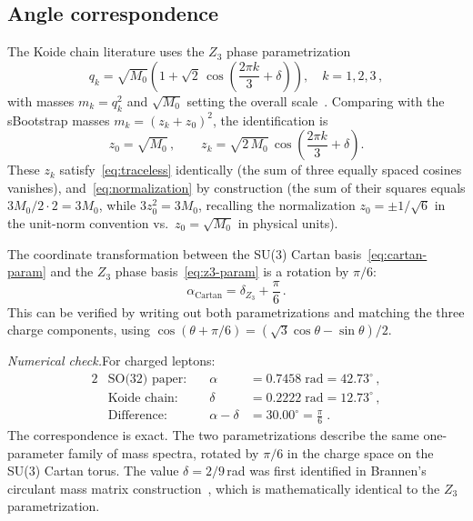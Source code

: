 \documentclass[prd,twocolumn,superscriptaddress,nofootinbib]{revtex4-2}
\begin{document}
\subsection{Angle correspondence}
\label{sec:angle}

The Koide chain literature uses the $Z_3$ phase parametrization
\begin{equation}
  q_k = \sqrt{M_0}\left(1+\sqrt{2}\,\cos\!\left(\frac{2\pi k}{3}
  +\delta\right)\right),\quad k=1,2,3\,,
  \label{eq:z3-param}
\end{equation}
with masses $m_k=q_k^2$ and $\sqrt{M_0}$ setting the overall
scale~\cite{Brannen2006,Zenczykowski2012}.  Comparing with
the sBootstrap masses $m_k=(z_k+z_0)^2$, the identification is
\begin{equation}
  z_0 = \sqrt{M_0}\,,\qquad
  z_k = \sqrt{2\,M_0}\,\cos\!\left(\frac{2\pi k}{3}+\delta\right).
  \label{eq:z-q-map}
\end{equation}
These $z_k$ satisfy~\eqref{eq:traceless} identically (the sum of three
equally spaced cosines vanishes), and~\eqref{eq:normalization} by
construction (the sum of their squares equals $3M_0/2\cdot 2 = 3M_0$,
while $3z_0^2=3M_0$, recalling the normalization $z_0=\pm 1/\sqrt{6}$
in the unit-norm convention vs.\ $z_0=\sqrt{M_0}$ in physical units).

The coordinate transformation between the SU(3) Cartan
basis~\eqref{eq:cartan-param} and the $Z_3$ phase
basis~\eqref{eq:z3-param} is a rotation by $\pi/6$:
\begin{equation}
  \alpha_{\text{Cartan}} = \delta_{Z_3} + \frac{\pi}{6}\,.
  \label{eq:angle-shift}
\end{equation}
This can be verified by writing out both parametrizations
and matching the three charge components, using
$\cos(\theta+\pi/6)=(\sqrt{3}\cos\theta-\sin\theta)/2$.

\medskip\noindent\textit{Numerical check.}\quad For charged leptons:
\begin{alignat}{2}
  &\text{SO(32) paper:} &\quad \alpha &= 0.7458\;\text{rad}
  = 42.73^\circ\,,\nonumber\\
  &\text{Koide chain:}  &\quad \delta &= 0.2222\;\text{rad}
  = 12.73^\circ\,,\label{eq:angle-check}\\
  &\text{Difference:}   &\quad \alpha-\delta &= 30.00^\circ
  = \frac{\pi}{6}\;.\nonumber
\end{alignat}
The correspondence is exact.  The two parametrizations describe the same
one-parameter family of mass spectra, rotated by $\pi/6$ in the charge
space on the SU(3) Cartan torus.  The value $\delta=2/9$\,rad was first
identified in Brannen's circulant mass matrix
construction~\cite{Brannen2006}, which is mathematically identical to
the $Z_3$ parametrization.
\end{document}
